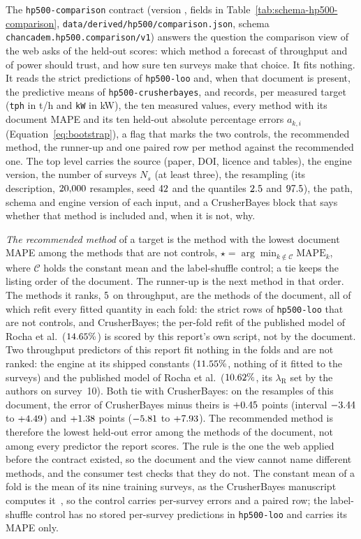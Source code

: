 The \texttt{hp500-comparison} contract (version , fields in Table~\ref{tab:schema-hp500-comparison},
\texttt{data/\allowbreak{}derived/\allowbreak{}hp500/\allowbreak{}comparison.json}, schema \texttt{chancadem.hp500.comparison/\allowbreak{}v1}) answers
the question the comparison view of the web asks of the held-out scores: which method a forecast of throughput and of power
should trust, and how sure ten surveys make that choice. It fits nothing. It reads the strict predictions of
\texttt{hp500-loo} and, when that document is present, the predictive means of \texttt{hp500-crusherbayes}, and records, per
measured target (\texttt{tph} in t/h and \texttt{kW} in kW), the ten measured values, every method with its document MAPE and
its ten held-out absolute percentage errors $a_{k,i}$ (Equation~\eqref{eq:bootstrap}), a flag that marks the two controls, the
recommended method, the runner-up and one paired row per method against the recommended one. The top level carries the
source (paper, DOI, licence and tables), the engine version, the number of surveys $N_s$ (at least three), the resampling
(its description, $20{,}000$ resamples, seed $42$ and the quantiles $2.5$ and $97.5$), the path, schema and engine
version of each input, and a CrusherBayes block that says whether that method is included and, when it is not, why.

\emph{The recommended method} of a target is the method with the lowest document MAPE among the methods that are not
controls, $\star=\arg\min_{k\notin\mathcal C}\mathrm{MAPE}_k$, where $\mathcal C$ holds the constant mean and the
label-shuffle control; a tie keeps the listing order of the document. The runner-up is the next method in that order. The
methods it ranks, $5$ on throughput, are the methods of the document, all of which refit every fitted quantity in each
fold: the strict rows of \texttt{hp500-loo} that are not controls, and CrusherBayes; the per-fold refit of the published model
of Rocha et al.\ ($14.65\%$) is scored by this report's own script, not by the document. Two throughput predictors of this report fit nothing in the folds and are not ranked: the
engine at its shipped constants ($11.55\%$, nothing of it fitted to the surveys) and the published model of Rocha
et al.\ ($10.62\%$, its $\lambda_{\mathrm R}$ set by the authors on survey~10). Both tie with CrusherBayes: on the resamples
of this document, the error of CrusherBayes minus theirs is $+0.45$ points (interval $-3.44$ to $+4.49$) and
$+1.38$ points ($-5.81$ to $+7.93$). The recommended method is therefore the lowest held-out error among the methods of the document, not among every predictor the report scores. The rule
is the one the web applied before the contract existed, so the document and the view cannot name different methods, and the
consumer test checks that they do not. The constant mean of a fold is the mean of its nine training surveys, as the CrusherBayes
manuscript computes it~\cite{crusherbayes2026}, so the control carries per-survey errors and a paired row; the label-shuffle
control has no stored per-survey predictions in \texttt{hp500-loo} and carries its MAPE only.

